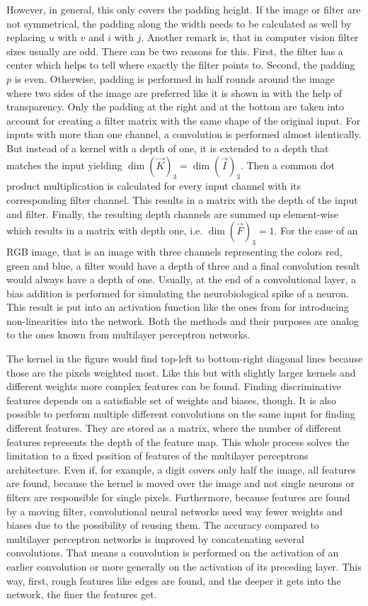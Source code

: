 However, in general, this only covers the padding height.
If the image or filter are not symmetrical, the padding along the width needs to be calculated as well by replacing $u$ with $v$ and $i$ with $j$.
Another remark is, that in computer vision filter sizes usually are odd.
There can be two reasons for this.
First, the filter has a center which helps to tell where exactly the filter points to.
Second, the padding $p$ is even.
Otherwise, padding is performed in half rounds around the image where two sides of the image are preferred like it is shown in  with the help of transparency.
Only the padding at the right and at the bottom are taken into account for creating a filter matrix with the same shape of the original input.
For inputs with more than one channel, a convolution is performed almost identically.
But instead of a kernel with a depth of one, it is extended to a depth that matches the input yielding $\dim\left(\vec{K}\right)_3 = \dim\left(\vec{I}\right)_3$.
Then a common dot product multiplication is calculated for every input channel with its corresponding filter channel.
This results in a matrix with the depth of the input and filter.
Finally, the resulting depth channels are summed up element-wise which results in a matrix with depth one, i.e. $\dim\left(\vec{F}\right)_3 = 1$.
For the case of an RGB image, that is an image with three channels representing the colors red, green and blue, a filter would have a depth of three and a final convolution result would always have a depth of one.
Usually, at the end of a convolutional layer, a bias addition is performed for simulating the neurobiological spike of a neuron.
This result is put into an activation function like the ones from  for introducing non-linearities into the network.
Both the methods and their purposes are analog to the ones known from multilayer perceptron networks.

The kernel in the figure would find top-left to bottom-right diagonal lines because those are the pixels weighted most.
Like this but with slightly larger kernels and different weights more complex features can be found.
Finding discriminative features depends on a satisfiable set of weights and biases, though.
It is also possible to perform multiple different convolutions on the same input for finding different features.
They are stored as a matrix, where the number of different features represents the depth of the feature map.
This whole process solves the limitation to a fixed position of features of the multilayer perceptrons architecture.
Even if, for example, a digit covers only half the image, all features are found, because the kernel is moved over the image and not single neurons or filters are responsible for single pixels.
Furthermore, because features are found by a moving filter, convolutional neural networks need way fewer weights and biases due to the possibility of reusing them.
The accuracy compared to multilayer perceptron networks is improved by concatenating several convolutions.
That means a convolution is performed on the activation of an earlier convolution or more generally on the activation of its preceding layer.
This way, first, rough features like edges are found, and the deeper it gets into the network, the finer the features get.
